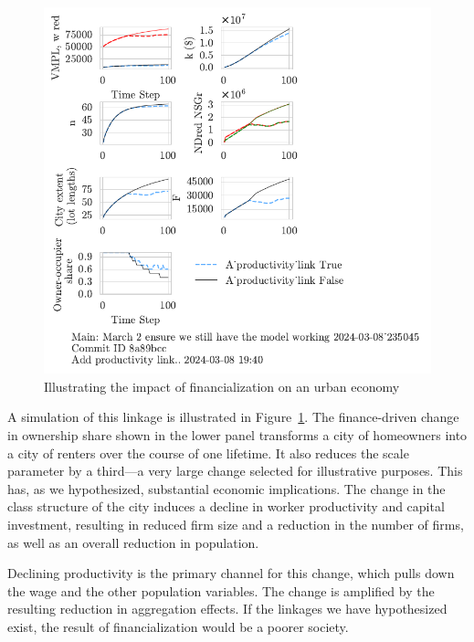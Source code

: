 \begin{figure}[h!tb]\label{fig-impact-channel-example}
    \centering
    \includegraphics[scale=1, trim=.25cm 2cm .25cm .25cm, clip]{fig/productivity_link.pdf}
    \caption{Illustrating the impact of financialization on an urban economy}
\end{figure}

A simulation of this linkage is illustrated in Figure~\ref{fig-impact-channel-example}. The finance-driven change in ownership share shown in the lower panel transforms a city of homeowners into a city of renters over the course of one lifetime. It also reduces the scale parameter by a third---a very large change selected for illustrative purposes. This has, as we hypothesized, substantial economic implications. The change in the class structure of the city induces a decline in worker productivity and capital investment, resulting in reduced firm size and a reduction in the number of firms, as well as an overall reduction in population. 

Declining productivity is the primary channel for this change, which pulls down the wage and the other population variables. The change is amplified by the resulting reduction in aggregation effects.  If the linkages we have hypothesized exist, the result of financialization would be a poorer society. 


